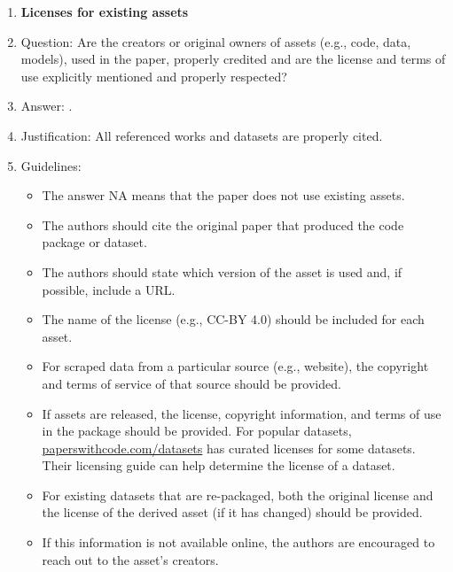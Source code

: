 \documentclass{article}
\begin{document}
\begin{enumerate}
\item {\bf Licenses for existing assets}
    \item[] Question: Are the creators or original owners of assets (e.g., code, data, models), used in the paper, properly credited and are the license and terms of use explicitly mentioned and properly respected?
    \item[] Answer: \answerYes{}.
    \item[] Justification: All referenced works and datasets are properly cited.
    \item[] Guidelines:
    \begin{itemize}
        \item The answer NA means that the paper does not use existing assets.
        \item The authors should cite the original paper that produced the code package or dataset.
        \item The authors should state which version of the asset is used and, if possible, include a URL.
        \item The name of the license (e.g., CC-BY 4.0) should be included for each asset.
        \item For scraped data from a particular source (e.g., website), the copyright and terms of service of that source should be provided.
        \item If assets are released, the license, copyright information, and terms of use in the package should be provided. For popular datasets, \url{paperswithcode.com/datasets} has curated licenses for some datasets. Their licensing guide can help determine the license of a dataset.
        \item For existing datasets that are re-packaged, both the original license and the license of the derived asset (if it has changed) should be provided.
        \item If this information is not available online, the authors are encouraged to reach out to the asset's creators.
    \end{itemize}


\end{enumerate}
\end{document}

